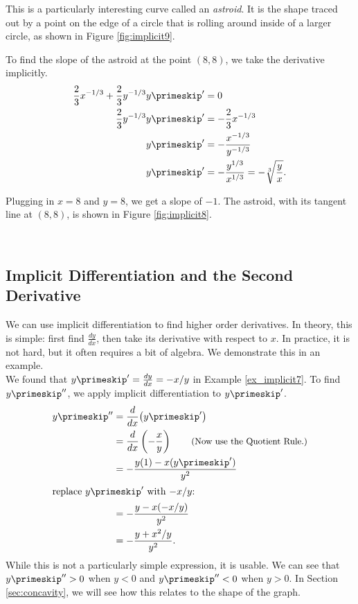 {This is a particularly interesting curve called an \emph{astroid}.  It is the shape traced out by a point on the edge of a circle that is rolling around inside of a larger circle, as shown in Figure \ref{fig:implicit9}.



To find the slope of the astroid at the point $(8,8)$, we take the derivative implicitly.
\begin{align*}
	\frac23x^{-1/3}+\frac23y^{-1/3}y\primeskip'&=0\\	
								\frac23y^{-1/3}y\primeskip' &= -\frac23x^{-1/3}\\
								y\primeskip'&=	-\frac{x^{-1/3}}{y^{-1/3}}\\
								y\primeskip'&=	-\frac{y^{1/3}}{x^{1/3}} = -\sqrt[3]{\frac{y}x}.
\end{align*}

Plugging in $x=8$ and $y=8$, we get a slope of $-1$. The astroid, with its tangent line at $(8,8)$, is shown in Figure \ref{fig:implicit8}.
}\\

\subsection*{Implicit Differentiation and the Second Derivative}

We can use implicit differentiation to find higher order derivatives. In theory, this is simple: first find $\frac{dy}{dx}$, then take its derivative with respect to $x$. In practice, it is not hard, but it often requires a bit of algebra. We demonstrate this in an example.\\

{We found that $y\primeskip' = \frac{dy}{dx} = -x/y$ in Example \ref{ex_implicit7}. To find $y\primeskip''$, we apply implicit differentiation to $y\primeskip'$.
\begin{align*}
y\primeskip'' &= \frac{d}{dx}\big(y\primeskip'\big) \\
		&= \frac{d}{dx}\left(-\frac xy\right)\qquad \text{\small (Now use the Quotient Rule.)} \\
		&= -\frac{y(1) - x(y\primeskip')}{y^2} \\
\intertext{replace $y\primeskip'$ with $-x/y$:}
		&= -\frac{y-x(-x/y)}{y^2}\\
		&= -\frac{y+x^2/y}{y^2}.
\end{align*}
While this is not a particularly simple expression, it is usable. We can see that $y\primeskip''>0$ when $y<0$ and $y\primeskip''<0$ when $y>0$. In Section \ref{sec:concavity}, we will see how this relates to the shape of the graph.
}\\


